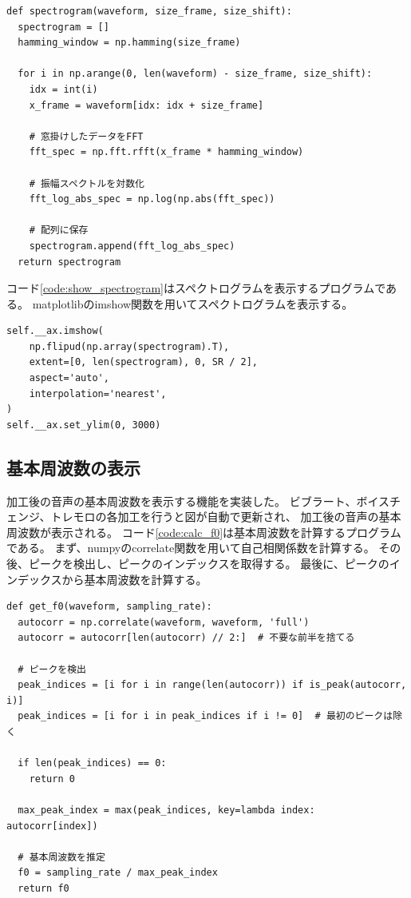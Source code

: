 \documentclass[a4paper,11pt]{jsarticle}
\begin{document}
\begin{lstlisting}[caption=スペクトログラム計算,label=code:calc_spectrogram]
def spectrogram(waveform, size_frame, size_shift):
  spectrogram = []
  hamming_window = np.hamming(size_frame)

  for i in np.arange(0, len(waveform) - size_frame, size_shift):
    idx = int(i)
    x_frame = waveform[idx: idx + size_frame]

    # 窓掛けしたデータをFFT
    fft_spec = np.fft.rfft(x_frame * hamming_window)

    # 振幅スペクトルを対数化
    fft_log_abs_spec = np.log(np.abs(fft_spec))

    # 配列に保存
    spectrogram.append(fft_log_abs_spec)
  return spectrogram
\end{lstlisting}

コード\ref{code:show_spectrogram}はスペクトログラムを表示するプログラムである。
matplotlibのimshow関数を用いてスペクトログラムを表示する。
\begin{lstlisting}[caption=スペクトログラム表示,label=code:show_spectrogram]
self.__ax.imshow(
    np.flipud(np.array(spectrogram).T),
    extent=[0, len(spectrogram), 0, SR / 2],
    aspect='auto',
    interpolation='nearest',
)
self.__ax.set_ylim(0, 3000)
\end{lstlisting}

\subsection{基本周波数の表示}
加工後の音声の基本周波数を表示する機能を実装した。
ビブラート、ボイスチェンジ、トレモロの各加工を行うと図が自動で更新され、
加工後の音声の基本周波数が表示される。
コード\ref{code:calc_f0}は基本周波数を計算するプログラムである。
まず、numpyのcorrelate関数を用いて自己相関係数を計算する。
その後、ピークを検出し、ピークのインデックスを取得する。
最後に、ピークのインデックスから基本周波数を計算する。

\begin{lstlisting}[caption=基本周波数計算,label=code:calc_f0]
def get_f0(waveform, sampling_rate):
  autocorr = np.correlate(waveform, waveform, 'full')
  autocorr = autocorr[len(autocorr) // 2:]  # 不要な前半を捨てる

  # ピークを検出
  peak_indices = [i for i in range(len(autocorr)) if is_peak(autocorr, i)]
  peak_indices = [i for i in peak_indices if i != 0]  # 最初のピークは除く

  if len(peak_indices) == 0:
    return 0

  max_peak_index = max(peak_indices, key=lambda index: autocorr[index])

  # 基本周波数を推定
  f0 = sampling_rate / max_peak_index
  return f0
\end{lstlisting}
\end{document}
